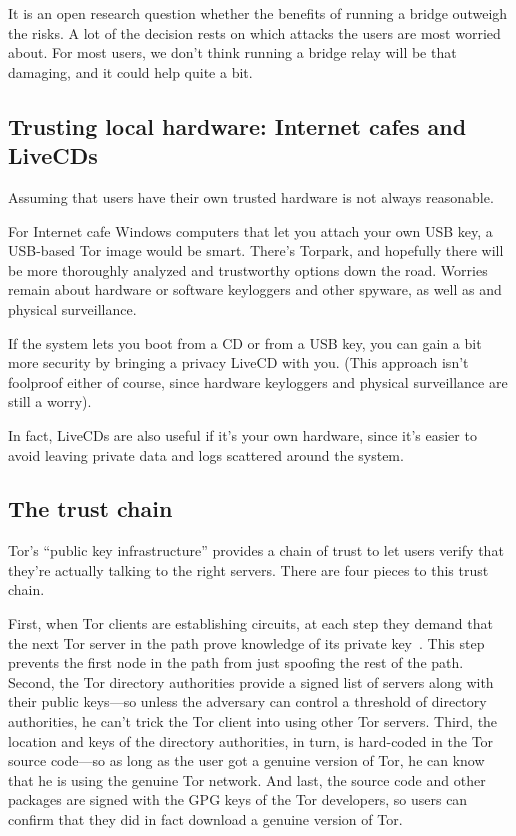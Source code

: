 \documentclass{llncs}
\begin{document}
It is an open research question whether the benefits of running a bridge
outweigh the risks. A lot of the decision rests on which attacks the
users are most worried about. For most users, we don't think running a
bridge relay will be that damaging, and it could help quite a bit.

\subsection{Trusting local hardware: Internet cafes and LiveCDs}
\label{subsec:cafes-and-livecds}

Assuming that users have their own trusted hardware is not
always reasonable.

For Internet cafe Windows computers that let you attach your own USB key,
a USB-based Tor image would be smart. There's Torpark, and hopefully
there will be more thoroughly analyzed and trustworthy options down the
road. Worries remain about hardware or software keyloggers and other
spyware, as well as and physical surveillance.

If the system lets you boot from a CD or from a USB key, you can gain
a bit more security by bringing a privacy LiveCD with you. (This
approach isn't foolproof either of course, since hardware
keyloggers and physical surveillance are still a worry).

In fact, LiveCDs are also useful if it's your own hardware, since it's
easier to avoid leaving private data and logs scattered around the
system.

%

\subsection{The trust chain}
\label{subsec:trust-chain}

Tor's ``public key infrastructure'' provides a chain of trust to
let users verify that they're actually talking to the right servers.
There are four pieces to this trust chain.

First, when Tor clients are establishing circuits, at each step
they demand that the next Tor server in the path prove knowledge of
its private key~\cite{tor-design}. This step prevents the first node
in the path from just spoofing the rest of the path. Second, the
Tor directory authorities provide a signed list of servers along with
their public keys---so unless the adversary can control a threshold
of directory authorities, he can't trick the Tor client into using other
Tor servers. Third, the location and keys of the directory authorities,
in turn, is hard-coded in the Tor source code---so as long as the user
got a genuine version of Tor, he can know that he is using the genuine
Tor network. And last, the source code and other packages are signed
with the GPG keys of the Tor developers, so users can confirm that they
did in fact download a genuine version of Tor.
\end{document}

